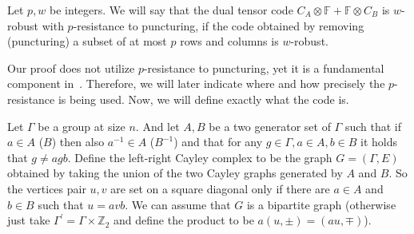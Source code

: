 \begin{definition}
  \label{def:resistance}
  Let $p,w$ be integers. We will say that the dual tensor code $C_{A} \otimes \mathbb{F} + \mathbb{F} \otimes C_{B}$ is $w$-robust with $p$-resistance to puncturing, if the code obtained by removing (puncturing) a subset of at most $p$ rows and columns is $w$-robust.   
\end{definition}
Our proof does not utilize $p$-resistance to puncturing, yet it is a fundamental component in~\cite{leverrier2022quantum}. Therefore, we will later indicate where and how precisely the $p$-resistance is being used. Now, we will define exactly what the code is.
\begin{definition}

%
%
%
  Let $\Gamma$ be a group at size $n$. And let $A,B$ be a two generator set of $\Gamma$ such that if $a \in A$ ($B$) then also $a^{-1}\in A$ ($B^{-1}$) and that for any $g\in \Gamma, a \in A, b \in B$ it holds that $g \neq agb$. Define the left-right Cayley complex to be the graph $G = \left( \Gamma, E \right)$ obtained by taking the union of the two Cayley graphs generated by $A$ and $B$. So the vertices pair $u,v$ are set on a square diagonal only if there are $a\in A$ and $b \in B$ such that $u = avb$. We can assume that $G$ is a bipartite graph (otherwise just take $\Gamma^{\prime} = \Gamma \times \mathbb{Z}_{2}$ and define the product to be $a\left( u,\pm \right) = \left( au, \mp \right)$).



\end{definition}
